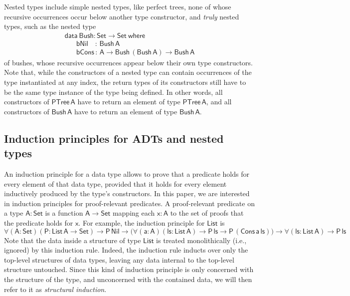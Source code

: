 \documentclass[9pt]{entcs} \usepackage{entcsmacro}
\begin{document}
Nested types include simple nested types, like perfect trees,
none of whose recursive occurrences occur below another type constructor,
and \emph{truly} nested types, such as the nested type
\begin{equation}\label{eq:bush}
\begin{array}{l}
\mathsf{data\ Bush : Set \to Set\ where}\\
\mathsf{\;\;\;\;\;\;bNil\,\,\,\,\,\, :\, Bush\,A}\\
\mathsf{\;\;\;\;\;\;bCons\, :\, A \to Bush\,(Bush\,A) \to Bush\,A} 
\end{array}
\end{equation}
of bushes, whose recursive occurrences appear below their own type constructors.
Note that, while the constructors of a nested type can contain occurrences of the type instantiated at any index,
the return types of its constructors still have to be the same type instance of the type being defined.
In other words, all constructors of $\mathsf{PTree\,A}$ have to return an element of type $\mathsf{PTree\,A}$,
and all constructors of $\mathsf{Bush\,A}$ have to return an element of type $\mathsf{Bush\,A}$.


\subsection{Induction principles for ADTs and nested types}\label{ssec:induction-nested}

An induction principle for a data type allows to prove
that a predicate holds for every element of that data type,
provided that it holds for every element inductively produced by the type's constructors.
In this paper, we are interested in induction principles for proof-relevant predicates.
A proof-relevant predicate on a type $\mathsf{A : Set}$ is a function $\mathsf{A \to Set}$
mapping each $\mathsf{x : A}$ to the set of proofs that the predicate holds for $\mathsf{x}$.
For example, the induction principle for $\mathsf{List}$ is
\begin{equation*}
\mathsf{
\forall (A : Set) (P : List\,A \to Set)
\to P\,Nil
\to \big( \forall (a : A) (ls: List\,A)
\to P\,ls
\to P\,(Cons\,a\,ls)\big)
\to \forall (ls : List\,A)
\to P\, ls
}
\end{equation*}
Note that the data inside a structure of type $\mathsf{List}$ is treated monolithically (i.e., ignored) by this induction rule.
Indeed, the induction rule inducts over only the top-level structures of data types,
leaving any data internal to the top-level structure untouched.
Since this kind of induction principle is only concerned with the structure of the type,
and unconcerned with the contained data,
we will then refer to it as \emph{structural induction}.
\end{document}

